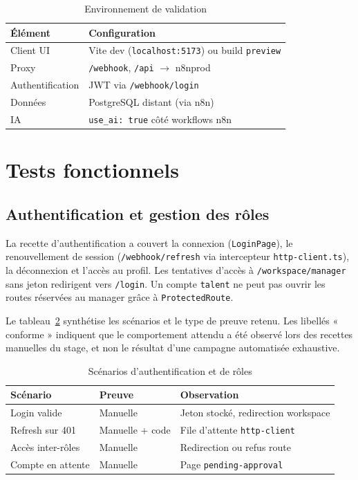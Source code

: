 \begin{table}[htbp]
\centering
\caption{Environnement de validation}
\label{tab:env-test-ch6}
\begin{tabular}{@{}ll@{}}
\toprule
\textbf{Élément} & \textbf{Configuration} \\
\midrule
Client UI & Vite dev (\texttt{localhost:5173}) ou build \texttt{preview} \\
Proxy & \texttt{/webhook}, \texttt{/api} $\rightarrow$ n8nprod \\
Authentification & JWT via \texttt{/webhook/login} \\
Données & PostgreSQL distant (via n8n) \\
IA & \texttt{use\_ai: true} côté workflows n8n \\
\bottomrule
\end{tabular}
\end{table}

\section{Tests fonctionnels}

\subsection{Authentification et gestion des rôles}

La recette d'authentification a couvert la connexion (\texttt{LoginPage}), le renouvellement de session (\texttt{/webhook/refresh} via intercepteur \texttt{http-client.ts}), la déconnexion et l'accès au profil. Les tentatives d'accès à \texttt{/workspace/manager} sans jeton redirigent vers \texttt{/login}. Un compte \texttt{talent} ne peut pas ouvrir les routes réservées au manager grâce à \texttt{ProtectedRoute}.

Le tableau~\ref{tab:auth-test-ch6} synthétise les scénarios et le type de preuve retenu. Les libellés « conforme » indiquent que le comportement attendu a été observé lors des recettes manuelles du stage, et non le résultat d'une campagne automatisée exhaustive.

\begin{table}[htbp]
\centering
\caption{Scénarios d'authentification et de rôles}
\label{tab:auth-test-ch6}
\begin{tabular}{@{}p{4.2cm}p{3.2cm}p{4.6cm}@{}}
\toprule
\textbf{Scénario} & \textbf{Preuve} & \textbf{Observation} \\
\midrule
Login valide & Manuelle & Jeton stocké, redirection workspace \\
Refresh sur 401 & Manuelle + code & File d'attente \texttt{http-client} \\
Accès inter-rôles & Manuelle & Redirection ou refus route \\
Compte en attente & Manuelle & Page \texttt{pending-approval} \\
\bottomrule
\end{tabular}
\end{table}

